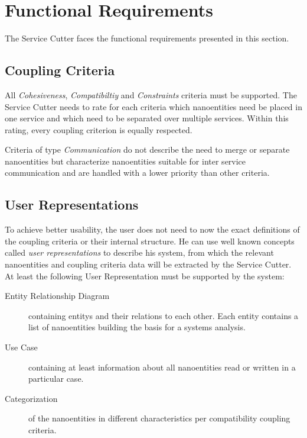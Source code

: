 \section{Functional Requirements}
\label{sec:functionalRequirements}

The Service Cutter faces the functional requirements presented in this
section.


\subsection{Coupling Criteria}

All \textit{Cohesiveness}, \textit{Compatibiltiy} and \textit{Constraints} criteria must be supported. The Service Cutter needs to rate for each criteria which nanoentities need be placed in one service and which need to be separated over multiple services. Within this rating, every coupling criterion is equally respected.

Criteria of type \textit{Communication} do not describe the need to merge or separate nanoentities but characterize nanoentities suitable for inter service communication and are handled with a lower priority than other criteria. 

\subsection{User Representations}

To achieve better usability, the user does not need to now the exact definitions of the coupling criteria or their internal structure. He can use well known concepts called \textit{user representations} to describe his system, from which the relevant nanoentities and coupling criteria data will be extracted by the Service Cutter. At least the following User Representation must be supported by the system:

\begin{description}
	\item[Entity Relationship Diagram] containing \glspl{entity} and their relations to each other. Each entity contains a list of nanoentities building the basis for a systems analysis.
	\item[Use Case] containing at least information about all nanoentities read or written in a particular case. 
	\item[Categorization] of the nanoentities in different characteristics per compatibility coupling criteria. 
\end{description}

